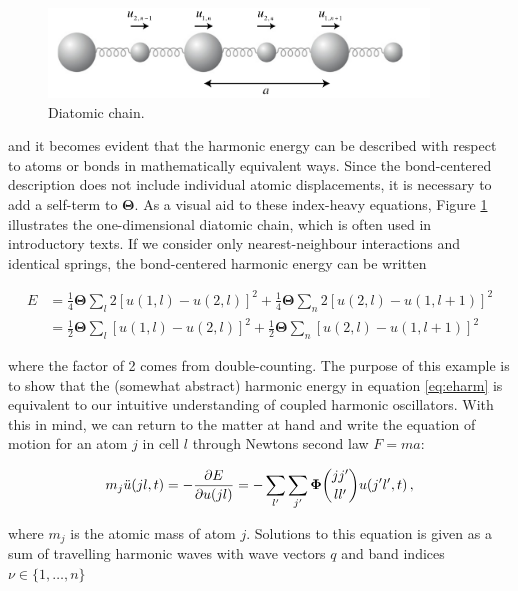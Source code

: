 \begin{figure}
	\centering
	\includegraphics[width=0.9\textwidth]{fig/temp/diatomic.png}
	\caption[diatomic chain]{Diatomic chain. }
	\label{fig:diatomic}
\end{figure}

\noindent and it becomes evident that the harmonic energy can be described with respect to atoms or bonds in mathematically equivalent ways. Since the bond-centered description does not include individual atomic displacements, it is necessary to add a self-term to $\bm{\Theta}$. As a visual aid to these index-heavy equations, Figure \ref{fig:diatomic} illustrates the one-dimensional diatomic chain, which is often used in introductory texts. If we consider only nearest-neighbour interactions and identical springs, the bond-centered harmonic energy can be written

\begin{align*}
E &= \frac{1}{4} \bm{\Theta} \sum_l 2 \left[ u(1,l) - u(2,l) \right]^2 + \frac{1}{4} \bm{\Theta} \sum_n 2 \left[ u(2,l) - u(1,l+1) \right]^2 \\
&= \frac{1}{2} \bm{\Theta} \sum_l \left[ u(1,l) - u(2,l) \right]^2 + \frac{1}{2} \bm{\Theta} \sum_n \left[ u(2,l) - u(1,l+1) \right]^2
\end{align*}

\noindent where the factor of 2 comes from double-counting. The purpose of this example is to show that the (somewhat abstract) harmonic energy in equation \eqref{eq:eharm} is equivalent to our intuitive understanding of coupled harmonic oscillators. With this in mind, we can return to the matter at hand and write the equation of motion for an atom $j$ in cell $l$ through Newtons second law $F=ma$:

\[ m_j \ddot{u}(jl, t) = - \frac{\partial E}{\partial u(jl)} = - \sum_{\lp} \sum_{\jp} \fc u(\jp \lp, t) \, , \]

\noindent where $m_j$ is the atomic mass of atom $j$. Solutions to this equation is given as a sum of travelling harmonic waves with wave vectors $q$ and band indices $\nu \in \{1,\dots , n \}$

